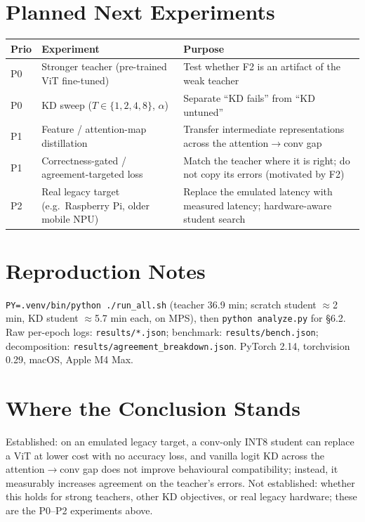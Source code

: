 \documentclass[11pt]{article}
\begin{document}
\section{Planned Next Experiments}
\begin{center}\begin{tabular}{p{0.6cm}p{5.0cm}p{8.0cm}}\toprule
Prio & Experiment & Purpose\\\midrule
P0 & Stronger teacher (pre-trained ViT fine-tuned) & Test whether F2 is an artifact of the weak teacher\\
P0 & KD sweep ($T\in\{1,2,4,8\}$, $\alpha$) & Separate ``KD fails'' from ``KD untuned''\\
P1 & Feature / attention-map distillation & Transfer intermediate representations across the attention$\rightarrow$conv gap\\
P1 & Correctness-gated / agreement-targeted loss & Match the teacher where it is right; do not copy its errors (motivated by F2)\\
P2 & Real legacy target (e.g.\ Raspberry Pi, older mobile NPU) & Replace the emulated latency with measured latency; hardware-aware student search\\\bottomrule
\end{tabular}\end{center}

\section{Reproduction Notes}\label{sec:repro}
\texttt{PY=.venv/bin/python ./run\_all.sh} (teacher 36.9 min; scratch student $\approx$2 min, KD student $\approx$5.7 min each, on MPS),
then \texttt{python analyze.py} for \S6.2. Raw per-epoch logs: \texttt{results/*.json}; benchmark: \texttt{results/bench.json};
decomposition: \texttt{results/agreement\_breakdown.json}. PyTorch 2.14, torchvision 0.29, macOS, Apple M4 Max.

\section{Where the Conclusion Stands}
Established: on an emulated legacy target, a conv-only INT8 student can replace a ViT at lower cost with no accuracy loss,
and vanilla logit KD across the attention$\rightarrow$conv gap does not improve behavioural compatibility; instead, it measurably
increases agreement on the teacher's errors. Not established: whether this holds for strong teachers, other KD objectives,
or real legacy hardware; these are the P0--P2 experiments above.
\end{document}
